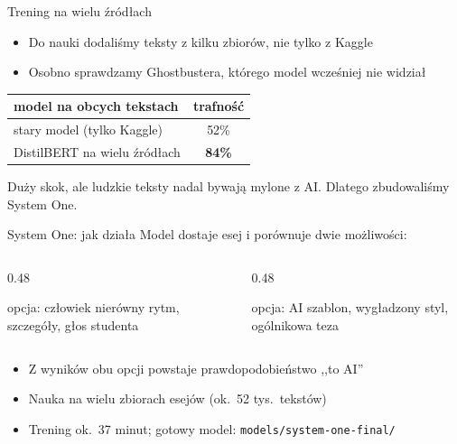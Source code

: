 \documentclass[aspectratio=169,11pt]{beamer}
\begin{document}
\begin{frame}{Trening na wielu źródłach}
  \begin{itemize}
    \item Do nauki dodaliśmy teksty z kilku zbiorów, nie tylko z Kaggle
    \item Osobno sprawdzamy Ghostbustera, którego model wcześniej nie widział
  \end{itemize}

  \vspace{0.8em}
  \begin{center}
  \begin{tabular}{lc}
    \toprule
    model na obcych tekstach & trafność \\
    \midrule
    stary model (tylko Kaggle) & 52\% \\
    DistilBERT na wielu źródłach & \textbf{84\%} \\
    \bottomrule
  \end{tabular}
  \end{center}

  \vspace{0.8em}
  Duży skok, ale ludzkie teksty nadal bywają mylone z AI.
  Dlatego zbudowaliśmy System One.
\end{frame}

\begin{frame}{System One: jak działa}
  Model dostaje esej i porównuje dwie możliwości:

  \vspace{0.6em}
  \begin{columns}[T]
    \begin{column}{0.48\textwidth}
      \begin{block}{opcja: człowiek}
        nierówny rytm, szczegóły, głos studenta
      \end{block}
    \end{column}
    \begin{column}{0.48\textwidth}
      \begin{block}{opcja: AI}
        szablon, wygładzony styl, ogólnikowa teza
      \end{block}
    \end{column}
  \end{columns}

  \vspace{0.6em}
  \begin{itemize}
    \item Z wyników obu opcji powstaje prawdopodobieństwo ,,to AI''
    \item Nauka na wielu zbiorach esejów (ok.\ 52 tys.\ tekstów)
    \item Trening ok.\ 37 minut; gotowy model: \texttt{models/system-one-final/}
  \end{itemize}
\end{frame}
\end{document}
